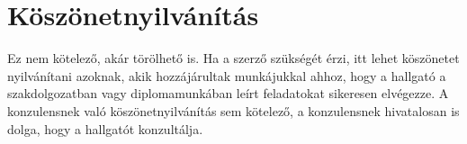 \chapter*{Köszönetnyilvánítás}

Ez nem kötelező, akár törölhető is. Ha a szerző szükségét érzi, itt lehet köszönetet nyilvánítani azoknak, akik hozzájárultak munkájukkal ahhoz, hogy a hallgató a szakdolgozatban vagy diplomamunkában leírt feladatokat sikeresen elvégezze. A konzulensnek való köszönetnyilvánítás sem kötelező, a konzulensnek hivatalosan is dolga, hogy a hallgatót konzultálja.
